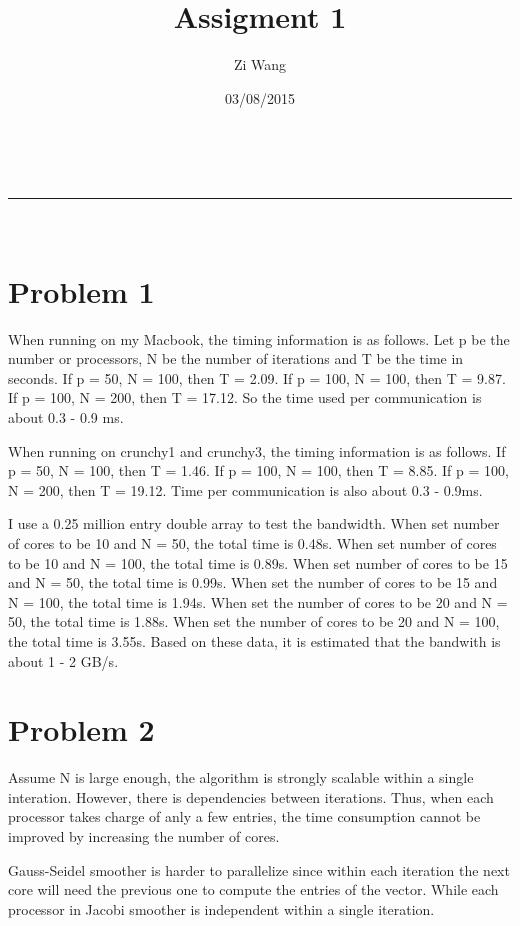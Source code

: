 \documentclass[a4paper,11pt]{article}
\makeatletter
\newcommand{\linia}{\rule{\linewidth}{0.5pt}}
\theoremstyle{mytheor}
\theoremstyle{mytheor}
\renewcommand{\maketitle}{
\begin{center}
\vspace{2ex}
{\huge \textsc{\@title}}
\vspace{1ex}
\\
\linia\\
\@author \hfill \@date
\vspace{4ex}
\end{center}
}
\makeatother
\begin{document}
\title{Assigment 1}

\author{Zi Wang}

\date{03/08/2015}

\maketitle

\section{Problem 1}

When running on my Macbook, the timing information is as follows. Let p be the number or processors, N be the number of iterations and T be the time in seconds. If p = 50, N = 100, then T = 2.09. If p = 100, N = 100, then T = 9.87. If p = 100, N = 200, then T = 17.12. So the time used per communication is about 0.3 - 0.9 ms.

When running on crunchy1 and crunchy3, the timing information is as follows. If p = 50, N = 100, then T = 1.46. If p = 100, N = 100, then T = 8.85. If p = 100, N = 200, then T = 19.12. Time per communication is also about 0.3 - 0.9ms.

I use a 0.25 million entry double array to test the bandwidth. When set number of cores to be 10 and N = 50, the total time is 0.48s. When set number of cores to be 10 and N = 100, the total time is 0.89s. When set number of cores to be 15 and N = 50, the total time is 0.99s. When set the number of cores to be 15 and N = 100, the total time is 1.94s. When set the number of cores to be 20 and N = 50, the total time is  1.88s. When set the number of cores to be 20 and N = 100, the total time is 3.55s.  Based on these data, it is estimated that the bandwith is about 1 - 2 GB/s. 

\clearpage

\section{Problem 2}
Assume N is large enough, the algorithm is strongly scalable within a single interation. However, there is dependencies between iterations. Thus, when each processor takes charge of anly a few entries, the time consumption cannot be improved by increasing the number of cores.

Gauss-Seidel smoother is harder to parallelize since within each iteration the next core will need the previous one to compute the entries of the vector. While each processor in Jacobi smoother is independent within a single iteration.
\end{document}
